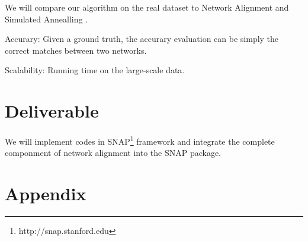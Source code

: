 \documentclass[11pt,letterpaper]{article}
\begin{document}
We will compare our algorithm on the real dataset to Network Alignment \cite{Narayanan2008} and Simulated Annealling \cite{Kreitmann2011}. 

Accurary: Given a ground truth, the accurary evaluation can be simply the correct matches between two networks. 

Scalability: Running time on the large-scale data.

\section{Deliverable}
We will implement codes in SNAP\footnote{http://snap.stanford.edu} framework and integrate the complete componment of network alignment into the SNAP package.  


\nocite{Ding2010,Wanga,Peng2012,Klau2009,Wondracek2010,Balduzzi2010,Koutra2011,Bayati2009,Bradde2010,Cromi2009,Flannick2009,Memisevic2012,Kreitmann2011,Narayanan2009,Delcher2002,Kollias2012,Mohammadi,Kuchaiev2007,Wangb,Liao2009,El-Kebir2011,Bayati2009a,Pache2012,Pache2012a,Kollias2011,Doan,Bayatia,Koyuturk2006,Todor2007,Narayanan2008,Burkhart2010,Backstrom2007}





\section{Appendix}
\end{document}
